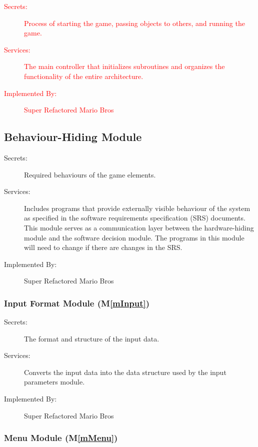 \documentclass[12pt, titlepage]{article}
\newcommand{\mref}[1]{M\ref{#1}}
\begin{document}
\begin{description}
\item[\textcolor{red}{Secrets:}] \textcolor{red}{Process of starting the game, passing objects to others, and running the game.}
\item[\textcolor{red}{Services:}] \textcolor{red}{The main controller that initializes subroutines and organizes the functionality of the entire architecture.}
\item[\textcolor{red}{Implemented By:}] \textcolor{red}{Super Refactored Mario Bros}
\end{description}

\subsection{Behaviour-Hiding Module}

\begin{description}
\item[Secrets:] Required behaviours of the game elements.
\item[Services:]Includes programs that provide externally visible behaviour of
  the system as specified in the software requirements specification (SRS)
  documents. This module serves as a communication layer between the
  hardware-hiding module and the software decision module. The programs in this
  module will need to change if there are changes in the SRS.
\item[Implemented By:] Super Refactored Mario Bros
\end{description}

\subsubsection{Input Format Module (\mref{mInput})}

\begin{description}
\item[Secrets:]The format and structure of the input data.
\item[Services:]Converts the input data into the data structure used by the
  input parameters module.
\item[Implemented By:] Super Refactored Mario Bros
\end{description}

\subsubsection{Menu Module (\mref{mMenu})}
\end{document}
